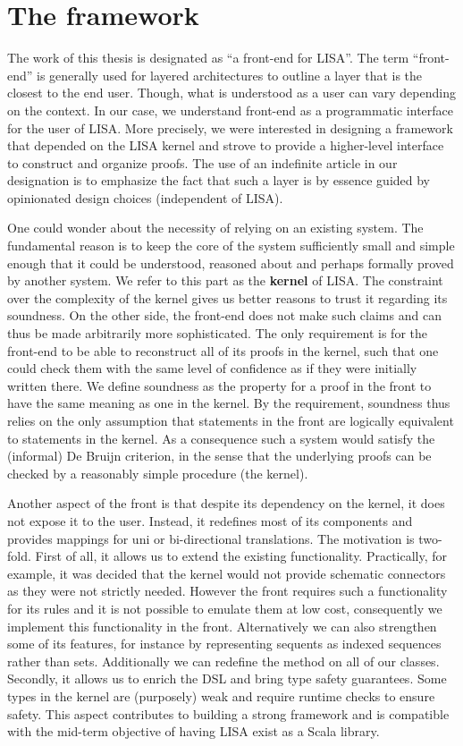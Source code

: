 \section{The framework}
\label{sec:framework}

The work of this thesis is designated as ``a front-end for LISA''. The term ``front-end'' is generally used for layered architectures to outline a layer that is the closest to the end user. Though, what is understood as a user can vary depending on the context. In our case, we understand front-end as a programmatic interface for the user of LISA. More precisely, we were interested in designing a framework that depended on the LISA kernel and strove to provide a higher-level interface to construct and organize proofs. The use of an indefinite article in our designation is to emphasize the fact that such a layer is by essence guided by opinionated design choices (independent of LISA).

One could wonder about the necessity of relying on an existing system. The fundamental reason is to keep the core of the system sufficiently small and simple enough that it could be understood, reasoned about and perhaps formally proved by another system. We refer to this part as the \textbf{kernel} of LISA. The constraint over the complexity of the kernel gives us better reasons to trust it regarding its soundness. On the other side, the front-end does not make such claims and can thus be made arbitrarily more sophisticated. The only requirement is for the front-end to be able to reconstruct all of its proofs in the kernel, such that one could check them with the same level of confidence as if they were initially written there. We define soundness as the property for a proof in the front to have the same meaning as one in the kernel. By the requirement, soundness thus relies on the only assumption that statements in the front are logically equivalent to statements in the kernel. As a consequence such a system would satisfy the (informal) De Bruijn criterion, in the sense that the underlying proofs can be checked by a reasonably simple procedure (the kernel).

Another aspect of the front is that despite its dependency on the kernel, it does not expose it to the user. Instead, it redefines most of its components and provides mappings for uni or bi-directional translations. The motivation is two-fold. First of all, it allows us to extend the existing functionality. Practically, for example, it was decided that the kernel would not provide schematic connectors as they were not strictly needed. However the front requires such a functionality for its rules and it is not possible to emulate them at low cost, consequently we implement this functionality in the front. Alternatively we can also strengthen some of its features, for instance by representing sequents as indexed sequences rather than sets. Additionally we can redefine the method  on all of our classes. Secondly, it allows us to enrich the DSL and bring type safety guarantees. Some types in the kernel are (purposely) weak and require runtime checks to ensure safety. This aspect contributes to building a strong framework and is compatible with the mid-term objective of having LISA exist as a Scala library.

